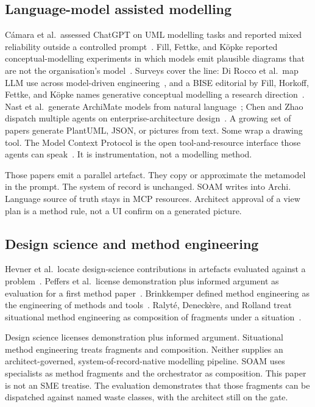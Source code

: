 \documentclass[10pt,journal,compsoc]{IEEEtran}
\begin{document}
\subsection{Language-model assisted modelling}

C{\'a}mara et al.\ assessed ChatGPT on UML modelling tasks and reported mixed reliability outside a controlled prompt~\cite{camara2023}. Fill, Fettke, and K{\"o}pke reported conceptual-modelling experiments in which models emit plausible diagrams that are not the organisation's model~\cite{fill2023}. Surveys cover the line: Di Rocco et al.\ map LLM use across model-driven engineering~\cite{dirrocco2025}, and a BISE editorial by Fill, Horkoff, Fettke, and K{\"o}pke names generative conceptual modelling a research direction~\cite{fill2026}. Nast et al.\ generate ArchiMate models from natural language~\cite{nast2026}; Chen and Zhao dispatch multiple agents on enterprise-architecture design~\cite{chen2024}. A growing set of papers generate PlantUML, JSON, or pictures from text. Some wrap a drawing tool. The Model Context Protocol is the open tool-and-resource interface those agents can speak~\cite{mcp2025,hou2025}. It is instrumentation, not a modelling method.

Those papers emit a parallel artefact. They copy or approximate the metamodel in the prompt. The system of record is unchanged. SOAM writes into Archi. Language source of truth stays in MCP resources. Architect approval of a view plan is a method rule, not a UI confirm on a generated picture.

\subsection{Design science and method engineering}

Hevner et al.\ locate design-science contributions in artefacts evaluated against a problem~\cite{hevner2004}. Peffers et al.\ license demonstration plus informed argument as evaluation for a first method paper~\cite{peffers2007}. Brinkkemper defined method engineering as the engineering of methods and tools~\cite{brinkkemper1996}. Ralyt{\'e}, Deneck{\`e}re, and Rolland treat situational method engineering as composition of fragments under a situation~\cite{ralyte2003}.

Design science licenses demonstration plus informed argument. Situational method engineering treats fragments and composition. Neither supplies an architect-governed, system-of-record-native modelling pipeline. SOAM uses specialists as method fragments and the orchestrator as composition. This paper is not an SME treatise. The evaluation demonstrates that those fragments can be dispatched against named waste classes, with the architect still on the gate.
\end{document}
